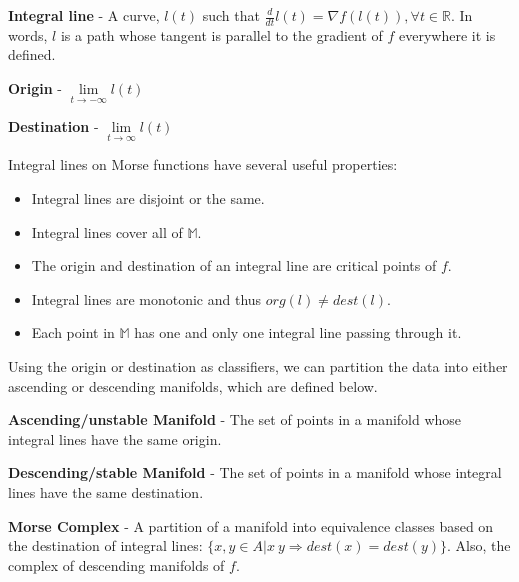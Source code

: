 \begin{defn}
  \textbf{Integral line} - A curve, $l(t)$ such that $\frac{d}{dt}l(t) = \nabla f(l(t)), \forall t \in \mathbb{R}$. In words, $l$ is a path whose tangent is parallel to the gradient of $f$ everywhere it is defined.
\end{defn}

\begin{defn}
  \textbf{Origin} - $\lim\limits_{t\to-\infty} l(t)$
\end{defn}

\begin{defn}
  \textbf{Destination} - $\lim\limits_{t \to \infty} l(t)$
\end{defn}

Integral lines on Morse functions have several useful properties:

\begin{itemize}
\item Integral lines are disjoint or the same.
\item Integral lines cover all of $\mathbb{M}$.
\item The origin and destination of an integral line are critical points of $f$.
\item Integral lines are monotonic and thus $org(l) \neq dest(l)$.
\item Each point in $\mathbb{M}$ has one and only one integral line passing through it.
\end{itemize}

Using the origin or destination as classifiers, we can partition the data into either ascending or descending manifolds, which are defined below.

\begin{defn}
  \textbf{Ascending/unstable Manifold} - The set of points in a manifold whose integral lines have the same origin.
\end{defn}

\begin{defn}
  \textbf{Descending/stable Manifold} - The set of points in a manifold whose integral lines have the same destination.
\end{defn}


\begin{defn}
 \textbf{Morse Complex} - A partition of a manifold into equivalence classes based on the destination of integral lines: $\{x,y \in A | x~y \Rightarrow dest(x) = dest(y)\}$. Also, the complex of descending manifolds of $f$.
\end{defn}

